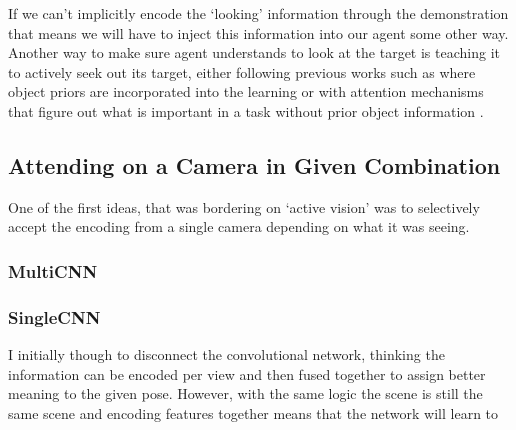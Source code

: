 If we can't implicitly encode the `looking' information through the demonstration that means we will have to inject this information into our agent some other way. Another way to make sure agent understands to look at the target is teaching it to actively seek out its target, either following previous works such as  where object priors are incorporated into the learning or with attention mechanisms that figure out what is important in a task without prior object information .  

\subsection{Attending on a Camera in Given Combination}
One of the first ideas, that was bordering on `active vision' was to selectively accept the encoding from a single camera depending on what it was seeing. 


\subsubsection{MultiCNN}
\subsubsection{SingleCNN}
I initially though to disconnect the convolutional network, thinking the information can be encoded per view and then fused together to assign better meaning to the given pose. However, with the same logic the scene is still the same scene and encoding features together means that the network will learn to 